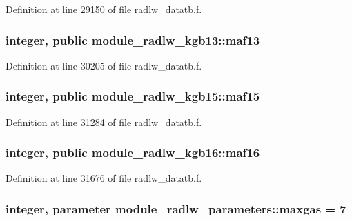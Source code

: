 Definition at line 29150 of file radlw\+\_\+datatb.\+f.

\subsubsection[{\texorpdfstring{maf13}{maf13}}]{\setlength{\rightskip}{0pt plus 5cm}integer, public module\+\_\+radlw\+\_\+kgb13\+::maf13}\hypertarget{group__module__radlw__main_ga1ddc025df872b12194b8c6344cc0204e}{}\label{group__module__radlw__main_ga1ddc025df872b12194b8c6344cc0204e}


Definition at line 30205 of file radlw\+\_\+datatb.\+f.

\subsubsection[{\texorpdfstring{maf15}{maf15}}]{\setlength{\rightskip}{0pt plus 5cm}integer, public module\+\_\+radlw\+\_\+kgb15\+::maf15}\hypertarget{group__module__radlw__main_ga482858cf08fb1a14117dfbaa6a57fe8c}{}\label{group__module__radlw__main_ga482858cf08fb1a14117dfbaa6a57fe8c}


Definition at line 31284 of file radlw\+\_\+datatb.\+f.

\subsubsection[{\texorpdfstring{maf16}{maf16}}]{\setlength{\rightskip}{0pt plus 5cm}integer, public module\+\_\+radlw\+\_\+kgb16\+::maf16}\hypertarget{group__module__radlw__main_gaae4c96f4a2ae49c573189f2d63ccd4a3}{}\label{group__module__radlw__main_gaae4c96f4a2ae49c573189f2d63ccd4a3}


Definition at line 31676 of file radlw\+\_\+datatb.\+f.

\subsubsection[{\texorpdfstring{maxgas}{maxgas}}]{\setlength{\rightskip}{0pt plus 5cm}integer, parameter module\+\_\+radlw\+\_\+parameters\+::maxgas = 7}\hypertarget{group__module__radlw__main_ga01330b4ad09907f2db51cb516ed21033}{}\label{group__module__radlw__main_ga01330b4ad09907f2db51cb516ed21033}


